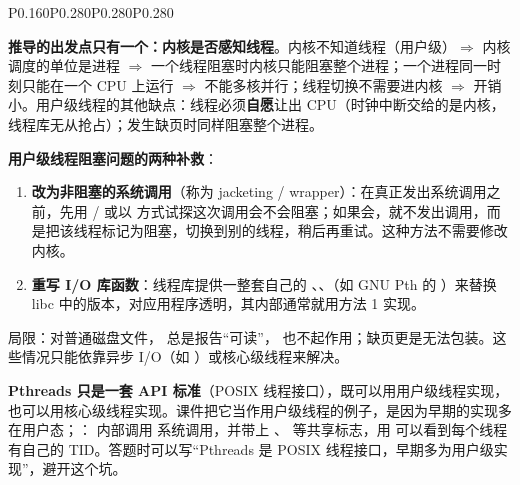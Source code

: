 \begin{btab}{P{0.160}P{0.280}P{0.280}P{0.280}}
\end{btab}
\textbf{推导的出发点只有一个：内核是否感知线程}。内核不知道线程（用户级）$\Rightarrow$ 内核调度的单位是进程 $\Rightarrow$ 一个线程阻塞时内核只能阻塞整个进程；一个进程同一时刻只能在一个 CPU 上运行 $\Rightarrow$ 不能多核并行；线程切换不需要进内核 $\Rightarrow$ 开销小。用户级线程的其他缺点：线程必须\textbf{自愿}让出 CPU（时钟中断交给的是内核，线程库无从抢占）；发生缺页时同样阻塞整个进程。

\textbf{用户级线程阻塞问题的两种补救}：
\begin{enumerate}
    \item \textbf{改为非阻塞的系统调用}（称为 jacketing / wrapper）：在真正发出系统调用之前，先用 / 或以  方式试探这次调用会不会阻塞；如果会，就不发出调用，而是把该线程标记为阻塞，切换到别的线程，稍后再重试。这种方法不需要修改内核。
    \item \textbf{重写 I/O 库函数}：线程库提供一整套自己的 、、（如 GNU Pth 的 ）来替换 libc 中的版本，对应用程序透明，其内部通常就用方法 1 实现。
\end{enumerate}
局限：对普通磁盘文件， 总是报告“可读”， 也不起作用；缺页更是无法包装。这些情况只能依靠异步 I/O（如 ）或核心级线程来解决。

\ez \textbf{Pthreads 只是一套 API 标准}（POSIX 线程接口），既可以用用户级线程实现，也可以用核心级线程实现。课件把它当作用户级线程的例子，是因为早期的实现多在用户态；： 内部调用  系统调用，并带上 、 等共享标志，用  可以看到每个线程有自己的 TID。答题时可以写“Pthreads 是 POSIX 线程接口，早期多为用户级实现”，避开这个坑。

